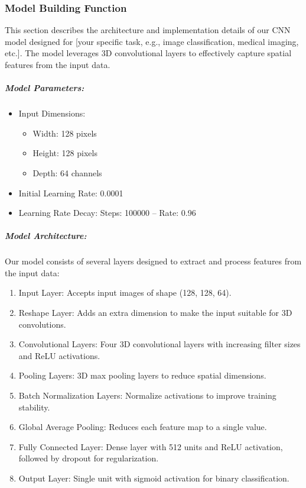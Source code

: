 \subsubsection{Model Building Function}

This section describes the architecture and implementation details of our CNN model designed for [your specific task, e.g., image classification, medical imaging, etc.]. The model leverages 3D convolutional layers to effectively capture spatial features from the input data.

\subparagraph{Model Parameters:}

\begin{itemize}
    \item Input Dimensions:
        \begin{itemize}
            \item Width: 128 pixels
            \item Height: 128 pixels
            \item Depth: 64 channels
        \end{itemize}
    \item Initial Learning Rate: 0.0001
    \item  Learning Rate Decay: Steps: 100000 -- Rate: 0.96
\end{itemize}

\subparagraph{Model Architecture:}

Our model consists of several layers designed to extract and process features from the input data:

\begin{enumerate}
    \item Input Layer: Accepts input images of shape (128, 128, 64).
    \item Reshape Layer: Adds an extra dimension to make the input suitable for 3D convolutions.
    \item Convolutional Layers: Four 3D convolutional layers with increasing filter sizes and ReLU activations.
    \item Pooling Layers: 3D max pooling layers to reduce spatial dimensions.
    \item Batch Normalization Layers: Normalize activations to improve training stability.
    \item Global Average Pooling: Reduces each feature map to a single value.
    \item Fully Connected Layer: Dense layer with 512 units and ReLU activation, followed by dropout for regularization.
    \item Output Layer: Single unit with sigmoid activation for binary classification.
\end{enumerate}

